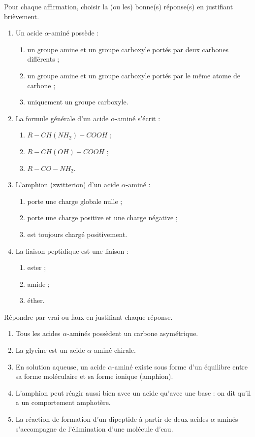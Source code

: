 \documentclass[11pt]{article}
\begin{document}
\begin{exercice}
Pour chaque affirmation, choisir la (ou les) bonne(s) réponse(s) en justifiant brièvement.
\begin{enumerate}
\item Un acide $\alpha$-aminé possède :
\begin{enumerate}
\item un groupe amine et un groupe carboxyle portés par deux carbones différents ;
\item un groupe amine et un groupe carboxyle portés par le même atome de carbone ;
\item uniquement un groupe carboxyle.
\end{enumerate}
\item La formule générale d'un acide $\alpha$-aminé s'écrit :
\begin{enumerate}
\item $R-CH(NH_2)-COOH$ ;
\item $R-CH(OH)-COOH$ ;
\item $R-CO-NH_2$.
\end{enumerate}
\item L'amphion (zwitterion) d'un acide $\alpha$-aminé :
\begin{enumerate}
\item porte une charge globale nulle ;
\item porte une charge positive et une charge négative ;
\item est toujours chargé positivement.
\end{enumerate}
\item La liaison peptidique est une liaison :
\begin{enumerate}
\item ester ; \item amide ; \item éther.
\end{enumerate}
\end{enumerate}
\end{exercice}

\begin{exercice}
Répondre par vrai ou faux en justifiant chaque réponse.
\begin{enumerate}
\item Tous les acides $\alpha$-aminés possèdent un carbone asymétrique.
\item La glycine  est un acide $\alpha$-aminé chirale.
\item En solution aqueuse, un acide $\alpha$-aminé existe sous forme d'un équilibre entre sa forme moléculaire et sa forme ionique (amphion).
\item L'amphion peut réagir aussi bien avec un acide qu'avec une base : on dit qu'il a un comportement amphotère.
\item La réaction de formation d'un dipeptide à partir de deux acides $\alpha$-aminés s'accompagne de l'élimination d'une molécule d'eau.
\end{enumerate}
\end{exercice}
\end{document}
